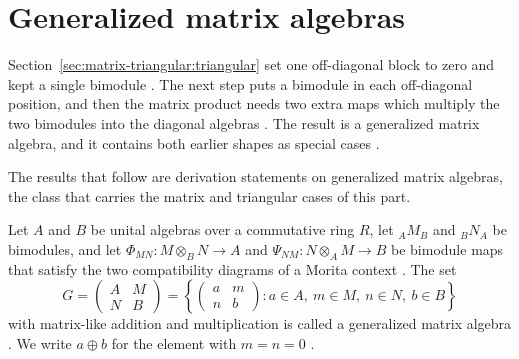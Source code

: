 \section{Generalized matrix algebras}\label{sec:matrix-triangular:generalized-matrix}

Section~\ref{sec:matrix-triangular:triangular} set one off-diagonal block to
zero and kept a single bimodule \cite[p.~119]{Cheung2001}. The next step puts
a bimodule in each off-diagonal position, and then the matrix product needs
two extra maps which multiply the two bimodules into the diagonal algebras
\cite[p.~2720]{DuWang2012}. The result is a generalized matrix algebra, and it
contains both earlier shapes as special cases \cite[p.~2720]{DuWang2012}.

The results that follow are derivation statements on generalized matrix
algebras, the class that carries the matrix and triangular cases of this part.

\begin{definition}\label{def:generalized:algebra}
Let $A$ and $B$ be unital algebras over a commutative ring $R$, let ${}_A M_B$ and
${}_B N_A$ be bimodules, and let $\Phi_{MN}\colon M\otimes_B N\to A$ and
$\Psi_{NM}\colon N\otimes_A M\to B$ be bimodule maps that satisfy the two
compatibility diagrams of a Morita context \cite[pp.~2719--2720]{DuWang2012}. The set
\[
G=\begin{pmatrix} A & M\\ N & B\end{pmatrix}
=\left\{\begin{pmatrix} a & m\\ n & b\end{pmatrix}:
a\in A,\ m\in M,\ n\in N,\ b\in B\right\}
\]
with matrix-like addition and multiplication is called a generalized matrix
algebra \cite[p.~2720]{DuWang2012}. We write $a\oplus b$ for the element with
$m=n=0$ \cite[p.~2720]{DuWang2012}.
\end{definition}

